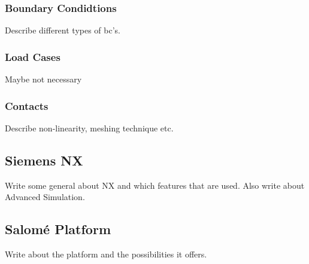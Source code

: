 \subsubsection{Boundary Condidtions} %
\label{ssub:boundary_condidtions}
Describe different types of bc's.

\subsubsection{Load Cases} %
\label{ssub:load_cases}
Maybe not necessary

\subsubsection{Contacts} %
\label{ssub:contacts}
Describe non-linearity, meshing technique etc.


\subsection{Siemens NX} %
\label{sub:siemens_nx}
Write some general about NX and which features that are used. Also write about Advanced Simulation.

\subsection{Salomé Platform} %
\label{sub:salom_platform}
Write about the platform and the possibilities it offers.

